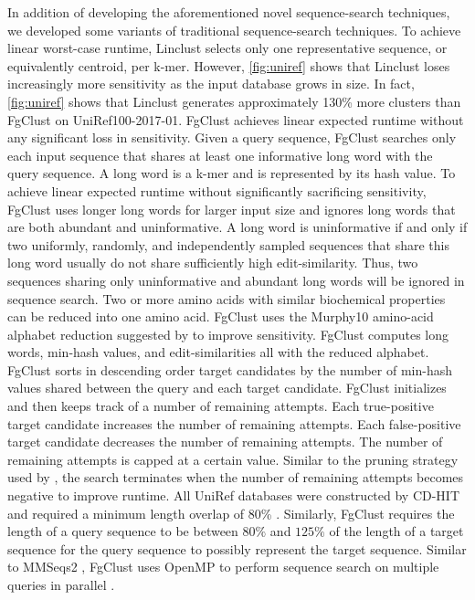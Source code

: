 \documentclass[11pt,letterpaper]{article}
\begin{document}
In addition of developing the aforementioned novel sequence-search techniques, we developed some variants of traditional sequence-search techniques.
To achieve linear worst-case runtime, Linclust selects only one representative sequence, or equivalently centroid, per k-mer.
However, \cref{fig:uniref} shows that Linclust loses increasingly more sensitivity as the input database grows in size. 
In fact, \cref{fig:uniref} shows that Linclust generates approximately 130\% more clusters than FgClust on UniRef100-2017-01.
FgClust achieves linear expected runtime without any significant loss in sensitivity.
Given a query sequence, FgClust searches only each input sequence that shares at least one informative long word with the query sequence.
A long word is a k-mer and is represented by its hash value.
To achieve linear expected runtime without significantly sacrificing sensitivity, FgClust uses longer long words for larger input size and ignores long words that are both abundant and uninformative.
A long word is uninformative if and only if two uniformly, randomly, and independently sampled sequences that share this long word usually do not share sufficiently high edit-similarity.
Thus, two sequences sharing only uninformative and abundant long words will be ignored in sequence search.
Two or more amino acids with similar biochemical properties can be reduced into one amino acid.
FgClust uses the Murphy10 amino-acid alphabet reduction suggested by \citet{murphy2000simplified} to improve sensitivity.
FgClust computes long words, min-hash values, and edit-similarities all with the reduced alphabet.
FgClust sorts in descending order target candidates by the number of min-hash values shared between the query and each target candidate.
FgClust initializes and then keeps track of a number of remaining attempts.
Each true-positive target candidate increases the number of remaining attempts.
Each false-positive target candidate decreases the number of remaining attempts.
The number of remaining attempts is capped at a certain value.
Similar to the pruning strategy used by \citet{edgar2010search}, the search terminates when the number of remaining attempts becomes negative to improve runtime.
All UniRef databases \citet{suzek2007uniref} were constructed by CD-HIT and required a minimum length overlap of 80\% \citep{suzek2014uniref}.
Similarly, FgClust requires the length of a query sequence to be between \(80\%\) and \(125\%\) of the length of a target sequence for the query sequence to possibly represent the target sequence. 
Similar to MMSeqs2 \citep{steinegger2017mmseqs2}, FgClust uses OpenMP to perform sequence search on multiple queries in parallel \citep{dagum1998openmp}.
\end{document}
